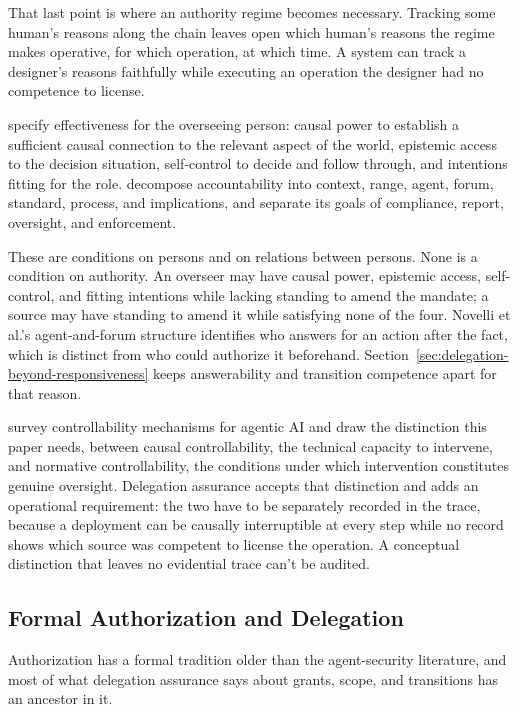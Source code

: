That last point is where an authority regime becomes necessary. Tracking some human's reasons along the chain leaves open which human's reasons the regime makes operative, for which operation, at which time. A system can track a designer's reasons faithfully while executing an operation the designer had no competence to license.

\Textcite{sterz2024effectiveOversight} specify effectiveness for the overseeing person: causal power to establish a sufficient causal connection to the relevant aspect of the world, epistemic access to the decision situation, self-control to decide and follow through, and intentions fitting for the role. \Textcite{novelli2024accountability} decompose accountability into context, range, agent, forum, standard, process, and implications, and separate its goals of compliance, report, oversight, and enforcement.

These are conditions on persons and on relations between persons. None is a condition on authority. An overseer may have causal power, epistemic access, self-control, and fitting intentions while lacking standing to amend the mandate; a source may have standing to amend it while satisfying none of the four. Novelli et al.'s agent-and-forum structure identifies who answers for an action after the fact, which is distinct from who could authorize it beforehand. Section~\ref{sec:delegation-beyond-responsiveness} keeps answerability and transition competence apart for that reason.

\Textcite{nguyen2026controllability} survey controllability mechanisms for agentic AI and draw the distinction this paper needs, between causal controllability, the technical capacity to intervene, and normative controllability, the conditions under which intervention constitutes genuine oversight. Delegation assurance accepts that distinction and adds an operational requirement: the two have to be separately recorded in the trace, because a deployment can be causally interruptible at every step while no record shows which source was competent to license the operation. A conceptual distinction that leaves no evidential trace can't be audited.

\subsection{Formal Authorization and Delegation}
\label{sec:formal-authorization}

Authorization has a formal tradition older than the agent-security literature, and most of what delegation assurance says about grants, scope, and transitions has an ancestor in it.

